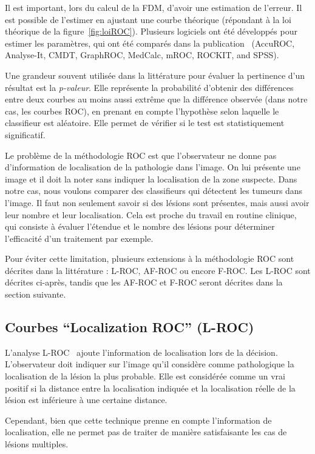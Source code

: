Il est important, lors du calcul de la FDM, d'avoir une estimation de l'erreur. Il est possible de l'estimer en ajustant une courbe théorique (répondant à la loi théorique de la figure~\ref{fig:loiROC}). Plusieurs logiciels ont été développés pour estimer les paramètres, qui ont été comparés dans la publication~\cite{CarstenStephan03012003} (AccuROC, Analyse-It, CMDT, GraphROC, MedCalc, mROC, ROCKIT, and SPSS).

\label{lab:p-valeur}
Une grandeur souvent utilisée dans la littérature pour évaluer la pertinence d'un résultat est la \emph{p-valeur}. Elle représente la probabilité d'obtenir des différences entre deux courbes au moins aussi extrême que la différence observée (dans notre cas, les courbes ROC), en prenant en compte l'hypothèse selon laquelle le classifieur est aléatoire. Elle permet de vérifier si le test est statistiquement significatif.

Le problème de la méthodologie ROC est que l'observateur ne donne pas d'information de localisation de la pathologie dans l'image. On lui présente une image et il doit la noter sans indiquer la localisation de la zone suspecte. Dans notre cas, nous voulons comparer des classifieurs qui détectent les tumeurs dans l'image. Il faut non seulement savoir si des lésions sont présentes, mais aussi avoir leur nombre et leur localisation. Cela est proche du travail en routine clinique, qui consiste à évaluer l'étendue et le nombre des lésions pour déterminer l'efficacité d'un traitement par exemple. 

Pour éviter cette limitation, plusieurs extensions à la méthodologie ROC sont décrites dans la littérature : L-ROC, AF-ROC ou encore F-ROC. Les L-ROC sont décrites ci-après, tandis que les AF-ROC et F-ROC seront décrites dans la section suivante.

\subsection{Courbes ``Localization ROC'' (L-ROC)}

L'analyse L-ROC~\cite{farquhar1999roc} ajoute l'information de localisation lors de la décision. L'observateur doit indiquer sur l'image qu'il considère comme pathologique la localisation de la lésion la plus probable. Elle est considérée comme un vrai positif si la distance entre la localisation indiquée et la localisation réelle de la lésion est inférieure à une certaine distance.

Cependant, bien que cette technique prenne en compte l'information de localisation, elle ne permet pas de traiter de manière satisfaisante les cas de lésions multiples.


